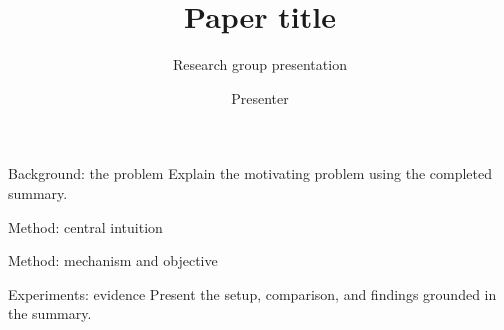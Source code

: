 \documentclass[aspectratio=169,10pt]{beamer}
\title{Paper title}
\subtitle{Research group presentation}
\author{Presenter}
\institute{ShanghaiTech University}
\date{}
\begin{document}
\VSPtitleframe

\begin{frame}{Background: the problem}
Explain the motivating problem using the completed summary.
\end{frame}

\begin{frame}{Method: central intuition}
\end{frame}

\begin{frame}{Method: mechanism and objective}
\end{frame}

\begin{frame}{Experiments: evidence}
Present the setup, comparison, and findings grounded in the summary.
\end{frame}

\end{document}
